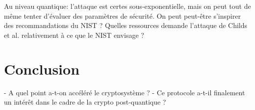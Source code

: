 \documentclass{article}
\theoremstyle{definition}
\begin{document}
Au niveau quantique: l'attaque est certes sous-exponentielle, mais on
peut tout de même tenter d'évaluer des paramètres de sécurité. On peut
peut-être s'inspirer des recommandations du NIST ? Quelles ressources
demande l'attaque de Childs et al. relativement à ce que le NIST
envisage ?


\section{Conclusion}

- A quel point a-t-on accéléré le cryptosystème ?
- Ce protocole a-t-il finalement un intérêt dans le cadre de la crypto post-quantique ?
\end{document}
